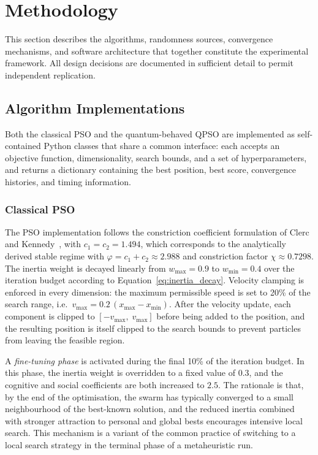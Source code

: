 \section{Methodology}
\label{sec:methodology}

This section describes the algorithms, randomness sources, convergence
mechanisms, and software architecture that together constitute the experimental
framework.  All design decisions are documented in sufficient detail to permit
independent replication.

\subsection{Algorithm Implementations}
\label{sec:meth:algorithms}

Both the classical PSO and the quantum-behaved QPSO are implemented as
self-contained Python classes that share a common interface: each accepts an
objective function, dimensionality, search bounds, and a set of
hyperparameters, and returns a dictionary containing the best position, best
score, convergence histories, and timing information.

\subsubsection{Classical PSO}

The PSO implementation follows the constriction coefficient formulation of
Clerc and Kennedy~\cite{Clerc2002}, with $c_1 = c_2 = 1.494$, which
corresponds to the analytically derived stable regime with
$\varphi = c_1 + c_2 \approx 2.988$ and constriction factor
$\chi \approx 0.7298$.  The inertia weight is decayed linearly from
$w_{\max} = 0.9$ to $w_{\min} = 0.4$ over the iteration budget according to
Equation~\eqref{eq:inertia_decay}.  Velocity clamping is enforced in every
dimension: the maximum permissible speed is set to 20\% of the search range,
i.e.\ $v_{\max} = 0.2\,(x_{\max} - x_{\min})$.  After the velocity update,
each component is clipped to $[-v_{\max},\; v_{\max}]$ before being added to
the position, and the resulting position is itself clipped to the search bounds
to prevent particles from leaving the feasible region.

A \emph{fine-tuning phase} is activated during the final 10\% of the iteration
budget.  In this phase, the inertia weight is overridden to a fixed value of
$0.3$, and the cognitive and social coefficients are both increased to $2.5$.
The rationale is that, by the end of the optimisation, the swarm has
typically converged to a small neighbourhood of the best-known solution, and
the reduced inertia combined with stronger attraction to personal and global
bests encourages intensive local search.  This mechanism is a variant of the
common practice of switching to a local search strategy in the terminal phase
of a metaheuristic run.

